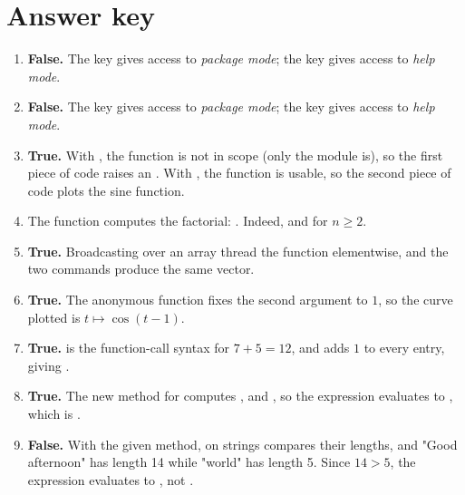 \documentclass{article}
\begin{document}
\section*{Answer key}
\begin{enumerate}[itemsep=8pt]
    \item \textbf{False.}
        The key \julia{]} gives access to \emph{package mode};
        the key  gives access to \emph{help mode}.

    \item \textbf{False.}
        The key \julia{]} gives access to \emph{package mode};
        the key  gives access to \emph{help mode}.

    \item \textbf{True.}
        With , the function  is not in scope
        (only the module  is), so the first piece of code
        raises an .
        With , the function  is usable,
        so the second piece of code plots the sine function.

    \item
        The function computes the factorial: .
        Indeed,  and
         for $n \geq 2$.

    \item \textbf{True.}
        Broadcasting  over an array thread the function
        elementwise, and the two commands produce the same vector.

    \item \textbf{True.}
        The anonymous function  fixes the
        second argument to $1$, so the curve plotted is
        $t \mapsto \cos(t - 1)$.

    \item \textbf{True.}
         is the function-call syntax for $7 + 5 = 12$, and
         adds $1$ to every entry,
        giving \julia{[2, 3, 4]}.

    \item \textbf{True.}
        The new method for  computes
        , and , so
        the expression evaluates to , which is
        .

    \item \textbf{False.}
        With the given method, \julia{>} on strings compares their lengths,
        and "Good afternoon" has length 14 while "world" has length 5.
        Since $14 > 5$, the expression evaluates to , not
        .


\end{enumerate}
\end{document}
